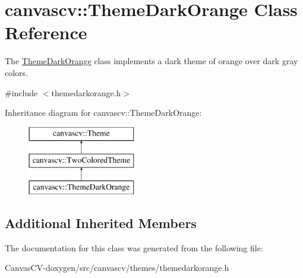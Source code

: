 \hypertarget{classcanvascv_1_1ThemeDarkOrange}{}\section{canvascv\+:\+:Theme\+Dark\+Orange Class Reference}
\label{classcanvascv_1_1ThemeDarkOrange}


The \hyperlink{classcanvascv_1_1ThemeDarkOrange}{Theme\+Dark\+Orange} class implements a dark theme of orange over dark gray colors.  




{\ttfamily \#include $<$themedarkorange.\+h$>$}

Inheritance diagram for canvascv\+:\+:Theme\+Dark\+Orange\+:\begin{figure}[H]
\begin{center}
\leavevmode
\includegraphics[height=3.000000cm]{classcanvascv_1_1ThemeDarkOrange}
\end{center}
\end{figure}
\subsection*{Additional Inherited Members}


The documentation for this class was generated from the following file\+:\begin{DoxyCompactItemize}
\item 
Canvas\+C\+V-\/doxygen/src/canvascv/themes/themedarkorange.\+h\end{DoxyCompactItemize}
